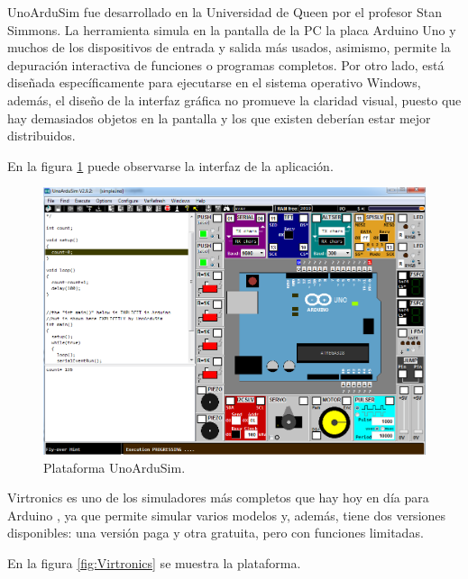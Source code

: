 UnoArduSim \citep{UnoArduSim} fue desarrollado en la Universidad de Queen \citep{Queensu} por el profesor Stan Simmons. La herramienta simula en la pantalla de la PC la placa Arduino Uno \citep{ArduinoUno} y muchos de los dispositivos de entrada y salida más usados, asimismo, permite la depuración interactiva de funciones o programas completos. Por otro lado, está diseñada específicamente para ejecutarse en el sistema operativo Windows, además, el diseño de la interfaz gráfica no promueve la claridad visual, puesto que hay demasiados objetos en la pantalla y los que existen deberían estar mejor distribuidos. 

En la figura \ref{fig:UnoArduSim} puede observarse la interfaz de la aplicación.
\hfill \break
\hfill \break
\hfill \break
\hfill \break

\begin{figure}[ht]
	\centering
	\includegraphics[scale=.33]{./Figures/UnoArduSim.png}
	\caption{Plataforma UnoArduSim.}
	\label{fig:UnoArduSim}
\end{figure}



Virtronics \citep{Virtronics} es uno de los simuladores más completos que hay hoy en día para Arduino \citep{Arduino}, ya que permite simular varios modelos y, además, tiene dos versiones disponibles: una versión paga y otra gratuita, pero con funciones limitadas. 

En la figura \ref{fig:Virtronics} se muestra la plataforma.

